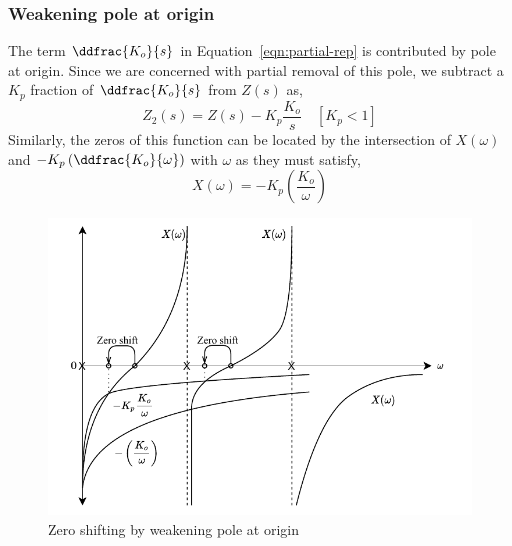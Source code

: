 \subsubsection*{Weakening pole at origin}
The term $\ddfrac{K_o}{s}$ in Equation~\ref{eqn:partial-rep} is contributed by pole at origin. Since we are concerned with partial removal of this pole, we subtract a $K_p$ fraction of $\ddfrac{K_o}{s}$ from $Z(s)$ as,
\begin{equation*}
    Z_2(s)=Z(s)-K_p\frac{K_o}{s} \quad [K_p<1]
\end{equation*}
Similarly, the zeros of this function can be located by the intersection of $X(\omega)$ and $-K_p\left(\ddfrac{K_o}{\omega}\right)$ with $\omega$ as they must satisfy,
\begin{equation*}
    X(\omega)=-K_p\left(\frac{K_o}{\omega}\right)
\end{equation*}
\begin{figure}[H]
    \centering
    \includegraphics{../Figures/zero_shifting_by_weakening_pole_at_org}
    \caption{Zero shifting by weakening pole at origin}
    \label{fig:pole-org}
\end{figure}

